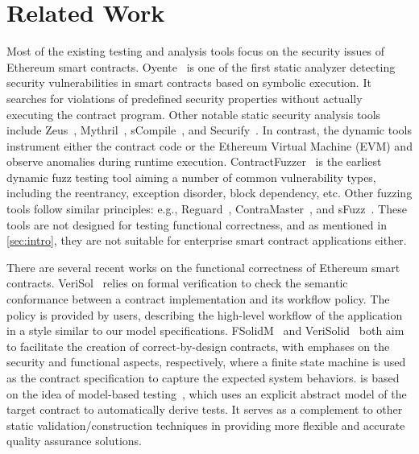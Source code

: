 \section{Related Work}
\label{sec:related_work}

Most of the existing testing and analysis tools focus on the security issues of Ethereum smart
contracts.
Oyente~\cite{oyente,luu2016making} is one of the first static analyzer detecting security
vulnerabilities in smart contracts based on symbolic execution.
It searches for violations of predefined security properties without actually executing the
contract program.
Other notable static security analysis tools include Zeus~\cite{kalra2018zeus},
Mythril~\cite{mythril}, sCompile~\cite{chang2018scompile}, and Securify~\cite{tsankov2018securify}.
In contrast, the dynamic tools instrument either the contract code or the Ethereum Virtual Machine
(EVM) and observe anomalies during runtime execution.
ContractFuzzer~\cite{jiang2018contractfuzzer} is the earliest dynamic fuzz testing tool aiming a
number of common vulnerability types, including the reentrancy, exception disorder, block
dependency, etc.
Other fuzzing tools follow similar principles: e.g., Reguard~\cite{liu2018reguard},
ContraMaster~\cite{wang2019vultron,wang2019oracle}, and sFuzz~\cite{nguyen2020sfuzz}.
These tools are not designed for testing functional correctness, and as mentioned in \cref{sec:intro}, they are not suitable for enterprise smart contract applications
either.

There are several recent works on the functional correctness of Ethereum smart contracts.
VeriSol~\cite{born2020formal} relies on formal verification to check the semantic conformance
between a contract implementation and its workflow policy.
The policy is provided by users, describing the high-level workflow of the application in a style
similar to our model specifications.
FSolidM~\cite{mavridou2018designing} and VeriSolid~\cite{Mavridou2019} both aim to facilitate the
creation of correct-by-design contracts, with emphases on the security and functional aspects,
respectively, 
where a finite state machine is used as the contract specification to capture the expected system behaviors.
\modcon is based on the idea of model-based testing~\cite{utting2012taxonomy}, which uses an explicit
abstract model of the target contract to automatically derive tests.
It serves as a complement to other static validation/construction techniques in providing more
flexible and accurate quality assurance solutions.

